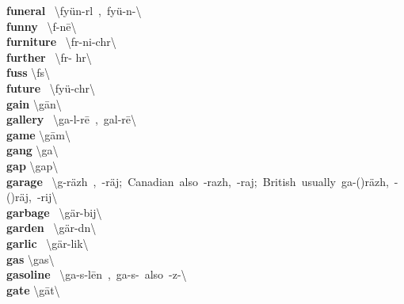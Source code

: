 \documentclass[10pt,a4paper]{article}
\begin{document}
\begin{multicols}{2}
\textbf{ funeral }\quad \ \textbackslash \textprimstress fy\"{u}n-r\textschwa l\ ,\ \textprimstress fy\"{u}-n\textschwa -\textbackslash \\
\textbf{ funny }\quad \ \textbackslash \textprimstress f\textschwa -n\={e}\textbackslash \\
\textbf{ furniture }\quad \ \textbackslash \textprimstress f\textschwa r-ni-ch\textschwa r\textbackslash \\
\textbf{ further }\quad \ \textbackslash \textprimstress f\textschwa r- h\textschwa r\textbackslash \\
\textbf{ fuss }\quad \textbackslash \textprimstress f\textschwa s\textbackslash \\
\textbf{ future }\quad \ \textbackslash \textprimstress fy\"{u}-ch\textschwa r\textbackslash \\
\textbf{ gain }\quad \textbackslash \textprimstress g\={a}n\textbackslash \\
\textbf{ gallery }\quad \ \textbackslash \textprimstress ga-l\textschwa -r\={e}\ ,\ \textprimstress gal-r\={e}\textbackslash \\
\textbf{ game }\quad \textbackslash \textprimstress g\={a}m\textbackslash \\
\textbf{ gang }\quad \textbackslash \textprimstress ga\engma \textbackslash \\
\textbf{ gap }\quad \textbackslash \textprimstress gap\textbackslash \\
\textbf{ garage }\quad \ \textbackslash g\textschwa -\textprimstress r\"{a}zh\ ,\ -\textprimstress r\"{a}j;\ Canadian\ also\ -\textprimstress razh,\ -\textprimstress raj;\ British\ usually\ \textprimstress ga-(\textsecstress )r\"{a}zh,\ -(\textsecstress )r\"{a}j,\ -rij\textbackslash \\
\textbf{ garbage }\quad \ \textbackslash \textprimstress g\"{a}r-bij\textbackslash \\
\textbf{ garden }\quad \ \textbackslash \textprimstress g\"{a}r-d\textsuperscript{\textreve}n\textbackslash \\
\textbf{ garlic }\quad \ \textbackslash \textprimstress g\"{a}r-lik\textbackslash \\
\textbf{ gas }\quad \textbackslash \textprimstress gas\textbackslash \\
\textbf{ gasoline }\quad \ \textbackslash \textprimstress ga-s\textschwa -\textsecstress l\={e}n\ ,\ \textsecstress ga-s\textschwa -\textprimstress \ also\ -z\textschwa -\textbackslash \\
\textbf{ gate }\quad \textbackslash \textprimstress g\={a}t\textbackslash \\

\end{multicols}
\end{document}
